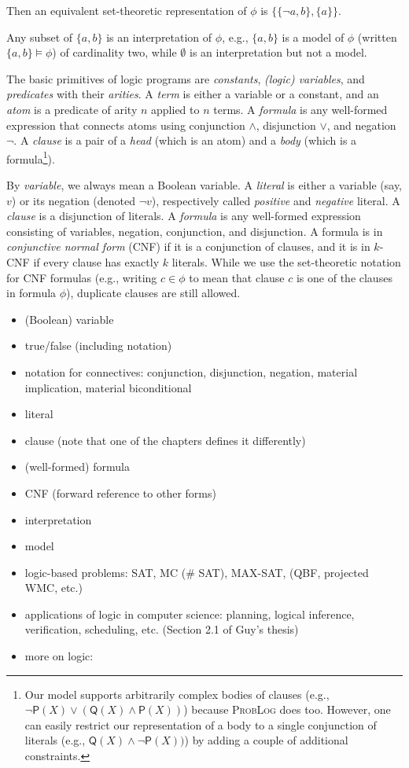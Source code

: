 Then an equivalent set-theoretic representation of $\phi$ is $\{ \{\neg a, b \}, \{ a \} \}$.

Any subset of $\{ a, b \}$ is an interpretation of $\phi$, e.g., $\{ a, b \}$ is a model of $\phi$ (written $\{ a, b \} \models \phi$) of cardinality two, while $\emptyset$ is an interpretation but not a model.

The basic primitives of logic programs are \emph{constants}, \emph{(logic)
variables}, and \emph{predicates} with their \emph{arities}. A \emph{term} is
either a variable or a constant, and an \emph{atom} is a predicate of arity $n$
applied to $n$ terms. A \emph{formula} is any well-formed expression that
connects atoms using conjunction $\land$, disjunction $\lor$, and negation
$\neg$. A \emph{clause} is a pair of a \emph{head} (which is an atom) and a
\emph{body} (which is a formula\footnote{Our model supports arbitrarily complex
bodies of clauses (e.g., $\neg\mathsf{P}(X) \lor (\mathsf{Q}(X) \land
\mathsf{P}(X))$) because \textsc{ProbLog} does too. However, one can easily
restrict our representation of a body to a single conjunction of literals
(e.g., $\mathsf{Q}(X) \land \neg\mathsf{P}(X))$) by adding a couple of
additional constraints.}).

By \emph{variable}, we always mean a Boolean variable. A \emph{literal} is
either a variable (say, $v$) or its negation (denoted $\neg v$), respectively
called \emph{positive} and \emph{negative} literal. A \emph{clause} is a
disjunction of literals. A \emph{formula} is any well-formed expression
consisting of variables, negation, conjunction, and disjunction. A formula is in
\emph{conjunctive normal form} (CNF) if it is a conjunction of clauses, and it
is in $k$-CNF if every clause has exactly $k$ literals. While we use the
set-theoretic notation for CNF formulas (e.g., writing $c \in \phi$ to mean that
clause $c$ is one of the clauses in formula $\phi$), duplicate clauses are still
allowed.

\begin{itemize}
\item (Boolean) variable
\item true/false (including notation)
\item notation for connectives: conjunction, disjunction, negation, material implication, material biconditional
\item literal
\item clause (note that one of the chapters defines it differently)
\item (well-formed) formula
\item CNF (forward reference to other forms)
\item interpretation
\item model
\item logic-based problems: SAT, MC (\# SAT), MAX-SAT, (QBF, projected WMC, etc.)
\item applications of logic in computer science: planning, logical inference, verification, scheduling, etc. (Section 2.1 of Guy's thesis)
\item more on logic: \citep{DBLP:books/daglib/0029942}
\end{itemize}

